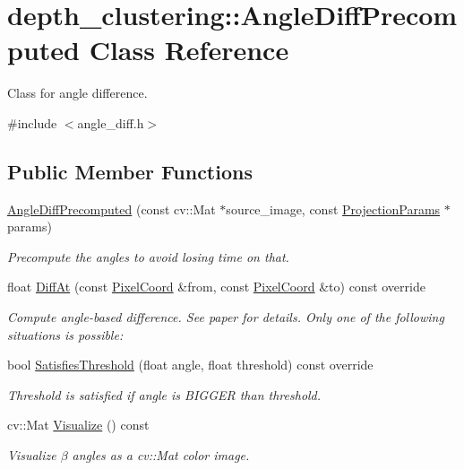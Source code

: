 \hypertarget{classdepth__clustering_1_1AngleDiffPrecomputed}{}\section{depth\+\_\+clustering\+:\+:Angle\+Diff\+Precomputed Class Reference}
\label{classdepth__clustering_1_1AngleDiffPrecomputed}


Class for angle difference.  




{\ttfamily \#include $<$angle\+\_\+diff.\+h$>$}

\subsection*{Public Member Functions}
\begin{DoxyCompactItemize}
\item 
\hyperlink{classdepth__clustering_1_1AngleDiffPrecomputed_a0cd5a0071d191d6a4f3594a789777ff3}{Angle\+Diff\+Precomputed} (const cv\+::\+Mat $\ast$source\+\_\+image, const \hyperlink{classdepth__clustering_1_1ProjectionParams}{Projection\+Params} $\ast$params)
\begin{DoxyCompactList}\small\item\em Precompute the angles to avoid losing time on that. \end{DoxyCompactList}\item 
float \hyperlink{classdepth__clustering_1_1AngleDiffPrecomputed_ae15bb5fc9488ae2b26c77665931b8626}{Diff\+At} (const \hyperlink{structdepth__clustering_1_1PixelCoord}{Pixel\+Coord} \&from, const \hyperlink{structdepth__clustering_1_1PixelCoord}{Pixel\+Coord} \&to) const override
\begin{DoxyCompactList}\small\item\em Compute angle-\/based difference. See paper for details. Only one of the following situations is possible\+: \end{DoxyCompactList}\item 
\mbox{\label{classdepth__clustering_1_1AngleDiffPrecomputed_a28a32c0cb0405163fe237909fe5f6c0c}} 
bool \hyperlink{classdepth__clustering_1_1AngleDiffPrecomputed_a28a32c0cb0405163fe237909fe5f6c0c}{Satisfies\+Threshold} (float angle, float threshold) const override
\begin{DoxyCompactList}\small\item\em Threshold is satisfied if angle is B\+I\+G\+G\+ER than threshold. \end{DoxyCompactList}\item 
cv\+::\+Mat \hyperlink{classdepth__clustering_1_1AngleDiffPrecomputed_a2fd85404d06843af0ee5c713017f6641}{Visualize} () const
\begin{DoxyCompactList}\small\item\em Visualize $\beta$ angles as a {\ttfamily cv\+::\+Mat} color image. \end{DoxyCompactList}\end{DoxyCompactItemize}
